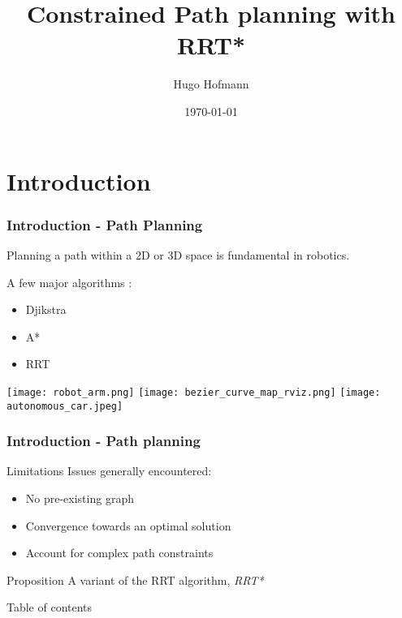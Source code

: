 \documentclass[pdftex,beamer]{beamer}
\title[RRT*]{Constrained Path planning with RRT*}
\author[H. Hofmann]{Hugo Hofmann}
\date{\today}
\institute{ENSTA Bretagne}
\theoremstyle{definition}
\theoremstyle{example}
\theoremstyle{plain}
\begin{document}
\frame{\titlepage}

\section*{Introduction}

\begin{frame}
  \frametitle{Introduction - Path Planning}

  Planning a path within a 2D or 3D space is fundamental in robotics.

  A few major algorithms :

  \begin{itemize}
    \item Djikstra
    \item A*
    \item RRT
  \end{itemize}


  \texttt{[image: robot\_arm.png]}
  \texttt{[image: bezier\_curve\_map\_rviz.png]}
  \texttt{[image: autonomous\_car.jpeg]}



  
\end{frame}

\begin{frame}
  \frametitle{Introduction - Path planning}

  \begin{alertblock}{Limitations}
    Issues generally encountered:
    \begin{itemize}
      \item No pre-existing graph
      \item Convergence towards an optimal solution
      \item Account for complex path constraints
    \end{itemize}
  \end{alertblock}

  \begin{exampleblock}{Proposition}
    A variant of the RRT algorithm, \textit{RRT*}
  \end{exampleblock}

\end{frame}

\begin{frame}{Table of contents}
  \tableofcontents
\end{frame}
\end{document}
